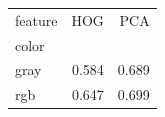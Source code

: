 \begin{tabular}{lrr}
\toprule
feature & HOG & PCA \\
color &  &  \\
\midrule
gray & 0.584 & 0.689 \\
rgb & 0.647 & 0.699 \\
\bottomrule
\end{tabular}
